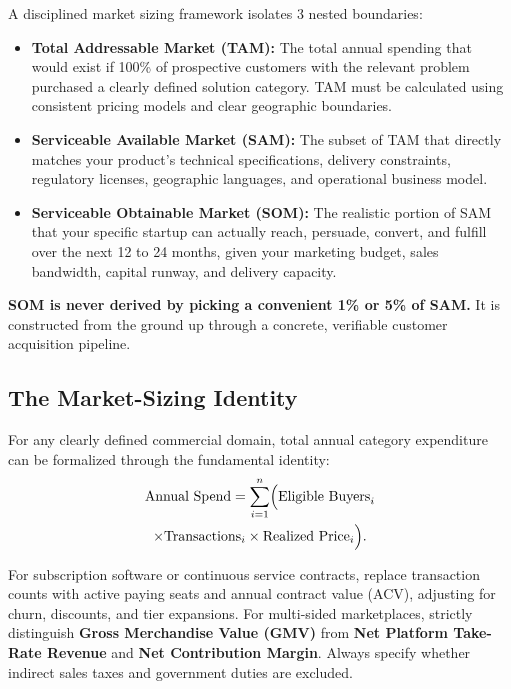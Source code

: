 A disciplined market sizing framework isolates 3 nested boundaries:
\begin{itemize}[leftmargin=12pt,itemsep=2pt,topsep=1pt]
  \item \textbf{Total Addressable Market (TAM):} The total annual spending that would exist if 100\% of prospective customers with the relevant problem purchased a clearly defined solution category. TAM must be calculated using consistent pricing models and clear geographic boundaries.
  \item \textbf{Serviceable Available Market (SAM):} The subset of TAM that directly matches your product's technical specifications, delivery constraints, regulatory licenses, geographic languages, and operational business model.
  \item \textbf{Serviceable Obtainable Market (SOM):} The realistic portion of SAM that your specific startup can actually reach, persuade, convert, and fulfill over the next 12 to 24 months, given your marketing budget, sales bandwidth, capital runway, and delivery capacity.
\end{itemize}

\textbf{SOM is never derived by picking a convenient 1\% or 5\% of SAM.} It is constructed from the ground up through a concrete, verifiable customer acquisition pipeline.

\subsection{The Market-Sizing Identity}

For any clearly defined commercial domain, total annual category expenditure can be formalized through the fundamental identity:
\begin{multline}
\label{eq:market_identity}
\text{Annual Spend} = \sum_{i=1}^{n} \Bigl(\text{Eligible Buyers}_i \\
\times \text{Transactions}_i \times \text{Realized Price}_i\Bigr).
\end{multline}

For subscription software or continuous service contracts, replace transaction counts with active paying seats and annual contract value (ACV), adjusting for churn, discounts, and tier expansions. For multi-sided marketplaces, strictly distinguish \textbf{Gross Merchandise Value (GMV)} from \textbf{Net Platform Take-Rate Revenue} and \textbf{Net Contribution Margin}. Always specify whether indirect sales taxes and government duties are excluded.

